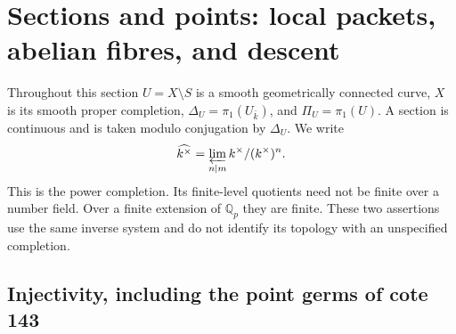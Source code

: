 \section{Sections and points: local packets, abelian fibres, and descent}
\label{sec:B}

Throughout this section $U=X\setminus S$ is a smooth geometrically connected
curve, $X$ is its smooth proper completion, $\Delta_U=\pi_1(U_{\bar k})$,
and $\Pi_U=\pi_1(U)$.  A section is continuous and is taken modulo
conjugation by $\Delta_U$.  We write
\[
 \widehat{k^\times}=\varprojlim_{n\mid m}k^\times/(k^\times)^n.
\]
This is the power completion.  Its finite-level quotients need not be finite
over a number field.  Over a finite extension of $\mathbb Q_p$ they are
finite.  These two assertions use the same inverse system and do not
identify its topology with an unspecified completion.

\subsection{Injectivity, including the point germs of cote 143}


